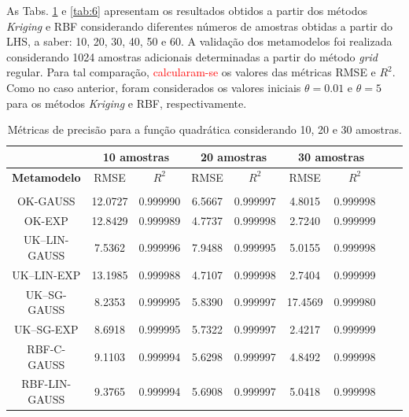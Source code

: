 As Tabs. \ref{tab:5} e \ref{tab:6} apresentam os resultados obtidos a partir dos métodos {\it Kriging} e RBF considerando diferentes números de amostras obtidas a partir do LHS, a saber: 10, 20, 30, 40, 50 e 60. A validação dos metamodelos foi realizada considerando 1024 amostras adicionais determinadas a partir do método {\it grid} regular. Para tal comparação, \textcolor{red}{calcularam-se} os valores das métricas RMSE e ${R}^2$. Como no caso anterior, foram considerados os valores iniciais $\theta=0.01$ e $\theta=5$ para os métodos {\it Kriging} e RBF, respectivamente. 

\begin{table}[H]
	\centering
	\caption{Métricas de precisão para a função quadrática considerando 10, 20 e 30 amostras.} \label{tab:5} 
	\begin{tabular}{c c c c c c c c c}
		\toprule
		& \multicolumn{2}{c}{\bf 10 amostras} & \multicolumn{2}{c}{\bf 20 amostras} & \multicolumn{2}{c}{\bf 30 amostras} \\ \midrule
		{\bf Metamodelo} & RMSE & {\bf $R^{2}$} & RMSE & {\bf $R^{2}$} & RMSE & {\bf $R^{2}$} \\
		\hline \\
		{OK-GAUSS} & 12.0727 & 0.999990 & 6.5667 & 0.999997 & 4.8015 &	0.999998 \\[4pt]
		OK-EXP & 12.8429 & 0.999989 & 4.7737 & 0.999998 & 2.7240 & 0.999999 \\[4pt]                 
		UK–LIN-GAUSS & 7.5362 & 0.999996 & 7.9488 &	0.999995 & 5.0155 & 0.999998  \\[4pt]
		UK–LIN-EXP & 13.1985 & 0.999988 & 4.7107 & 0.999998 & 2.7404 & 0.999999  \\[4pt]
		UK–SG-GAUSS  & 8.2353 & 0.999995  & 5.8390 & 0.999997 & 17.4569 & 0.999980 \\[4pt]
		UK–SG-EXP & 8.6918 & 0.999995 & 5.7322 & 0.999997 & 2.4217	& 0.999999 \\[4pt]
		RBF-C-GAUSS & 9.1103 & 0.999994 & 5.6298 & 0.999997 & 4.8492 & 0.999998  \\[4pt]
		RBF-LIN-GAUSS & 9.3765 & 0.999994 & 5.6908 & 0.999997 & 5.0418 & 0.999998 \\[4pt] \bottomrule
		
	\end{tabular}
	
\end{table}


